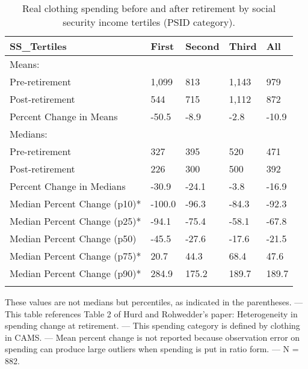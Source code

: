 \begin{table}[tbp] \centering
{}

\caption{Real clothing spending before and after retirement by social security income tertiles (PSID category).}
\begin{tabularx}{\textwidth}{lCCCC}

\toprule
{SS\_Tertiles}&{First}&{Second}&{Third}&{All} \tabularnewline
\midrule\addlinespace[1.5ex]
Means:&&&& \tabularnewline
\midrule Pre-retirement&1,099&813&1,143&979 \tabularnewline
Post-retirement&544&715&1,112&872 \tabularnewline
Percent Change in Means&-50.5&-8.9&-2.8&-10.9 \tabularnewline
\midrule Medians:&&&& \tabularnewline
\midrule Pre-retirement&327&395&520&471 \tabularnewline
Post-retirement&226&300&500&392 \tabularnewline
Percent Change in Medians&-30.9&-24.1&-3.8&-16.9 \tabularnewline
Median Percent Change (p10)*&-100.0&-96.3&-84.3&-92.3 \tabularnewline
Median Percent Change (p25)*&-94.1&-75.4&-58.1&-67.8 \tabularnewline
Median Percent Change (p50)&-45.5&-27.6&-17.6&-21.5 \tabularnewline
Median Percent Change (p75)*&20.7&44.3&68.4&47.6 \tabularnewline
Median Percent Change (p90)*&284.9&175.2&189.7&189.7 \tabularnewline
\bottomrule \addlinespace[1.5ex]

\end{tabularx}
\begin{flushleft}
\footnotesize *These values are not medians but percentiles, as indicated in the parentheses. \linebreak --- \linebreak This table references Table 2 of Hurd and Rohwedder's paper: Heterogeneity in spending change at retirement. \linebreak --- \linebreak This spending category is defined by clothing in CAMS. \linebreak --- \linebreak Mean percent change is not reported because observation error on spending can produce large outliers when spending is put in ratio form. \linebreak --- \linebreak N = 882.
\end{flushleft}
\end{table}
